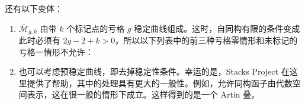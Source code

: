 还有以下变体：
\begin{enumerate}[label=(\alph*)]
\item $\overline{\mathcal M}_{g,k}$ 由带 $k$ 个标记点的亏格 $g$ 稳定曲线组成。这时，自同构有限的条件变成
此时必须有 $2g-2+k>0$，所以以下列表中的前三种亏格零情形和未标记的亏格一情形不允许：
\item 也可以考虑预稳定曲线，即去掉稳定性条件。幸运的是，Stacks Project 在这里提供了帮助，其中的处理具有更大的一般性。例如，允许同构函子由代数空间表示，这在很一般的情形下成立。这样得到的是一个 Artin 叠。
\end{enumerate}
